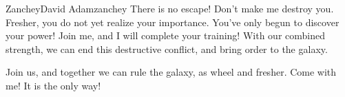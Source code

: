 \pagebreak

\begin{welcome}{Zanchey}{David Adam}{zanchey}
There is no escape! Don't make me destroy you. Fresher, you do not yet realize your importance. You've only begun to discover your power! Join me, and I will complete your training! With our combined strength, we can end this destructive conflict, and bring order to the galaxy.

Join us, and together we can rule the galaxy, as wheel and fresher. Come with me! It is the only way!

\end{welcome}


